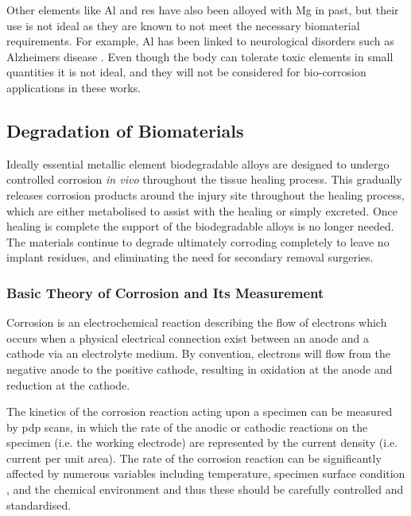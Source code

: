 \documentclass[a4paper,12pt,oneside]{report}%
\begin{document}
Other elements like Al and \glspl{re} have also been alloyed with Mg in past, but their use is not ideal as they are known to not meet the necessary biomaterial requirements. For example, Al has been linked to neurological disorders such as Alzheimers disease \cite{Zheng2014}. Even though the body can tolerate toxic elements in small quantities it is not ideal, and they will not be considered for bio-corrosion applications in these works. 

\subsection{Degradation of Biomaterials} 
Ideally essential metallic element biodegradable alloys are designed to undergo controlled corrosion \textit{in vivo} throughout the tissue healing process. This gradually releases corrosion products around the injury site throughout the healing process, which are either metabolised to assist with the healing or simply excreted. Once healing is complete the support of the biodegradable alloys is no longer needed. The materials continue to degrade ultimately corroding completely to leave no implant residues, and eliminating the need for secondary removal surgeries. 

\subsubsection{Basic Theory of Corrosion and Its Measurement}
Corrosion is an electrochemical reaction describing the flow of electrons which occurs when a physical electrical connection exist between an anode and a cathode via an electrolyte medium. By convention, electrons will flow from the negative anode to the positive cathode,  resulting in oxidation at the anode and reduction at the cathode. 

The kinetics of the corrosion reaction acting upon a specimen can be measured by \gls{pdp} scans, in which the rate of the anodic or cathodic reactions on the specimen (i.e. the working electrode) are represented by the current density (i.e. current per unit area). The rate of the corrosion reaction can be significantly affected by numerous variables including temperature, specimen surface condition \cite{Jones1992}, and the chemical environment and thus these should be carefully controlled and standardised. 
\end{document}
